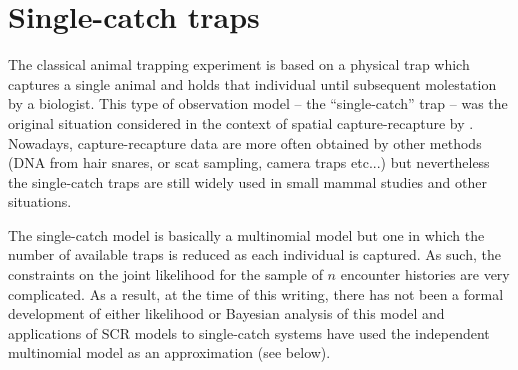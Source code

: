 \section{Single-catch traps}
\label{poisson-mn.sec.singlecatch}

The classical animal trapping experiment is based on a physical trap
which captures a single animal and holds that individual until
subsequent molestation by a biologist.
This type of observation model -- the ``single-catch'' trap --
was the original situation considered in the context of spatial
capture-recapture  by
\citet{efford:2004}. Nowadays, capture-recapture data are more often
obtained by other methods (DNA from hair snares, or scat sampling,
camera traps etc...) but nevertheless the single-catch traps are still
widely used in small mammal studies \citep{converse_etal:2006ea,
  converse_royle:2012} and other situations.

The single-catch model is basically a multinomial model but one in
which the number of available traps is reduced as each individual is
captured. As such, the constraints on the joint likelihood for the
sample of $n$ encounter histories are very complicated.
 As a
result, at the time of this writing, there has not been a formal
development of either likelihood or Bayesian analysis of this model
and applications of SCR models to single-catch systems have used the
independent multinomial model as an approximation (see below).


